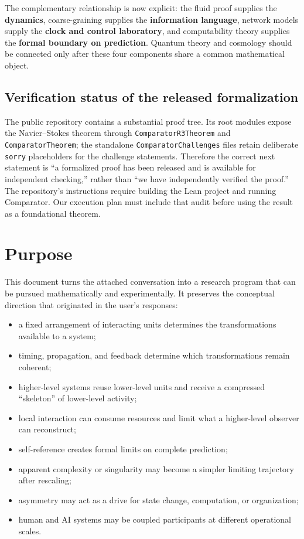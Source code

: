 \documentclass[11pt]{article}
\theoremstyle{definition}
\theoremstyle{plain}
\theoremstyle{remark}
\begin{document}
The complementary relationship is now explicit: the fluid proof supplies the \textbf{dynamics}, coarse-graining supplies the \textbf{information language}, network models supply the \textbf{clock and control laboratory}, and computability theory supplies the \textbf{formal boundary on prediction}. Quantum theory and cosmology should be connected only after these four components share a common mathematical object.

\subsection{Verification status of the released formalization}

The public repository contains a substantial proof tree. Its root modules expose the Navier--Stokes theorem through \texttt{ComparatorR3Theorem} and \texttt{ComparatorTheorem}; the standalone \texttt{ComparatorChallenges} files retain deliberate \texttt{sorry} placeholders for the challenge statements. Therefore the correct next statement is ``a formalized proof has been released and is available for independent checking,'' rather than ``we have independently verified the proof.'' The repository's instructions require building the Lean project and running Comparator. Our execution plan must include that audit before using the result as a foundational theorem.

\section{Purpose}

This document turns the attached conversation into a research program that can be pursued mathematically and experimentally. It preserves the conceptual direction that originated in the user's responses:
\begin{itemize}
  \item a fixed arrangement of interacting units determines the transformations available to a system;
  \item timing, propagation, and feedback determine which transformations remain coherent;
  \item higher-level systems reuse lower-level units and receive a compressed ``skeleton'' of lower-level activity;
  \item local interaction can consume resources and limit what a higher-level observer can reconstruct;
  \item self-reference creates formal limits on complete prediction;
  \item apparent complexity or singularity may become a simpler limiting trajectory after rescaling;
  \item asymmetry may act as a drive for state change, computation, or organization;
  \item human and AI systems may be coupled participants at different operational scales.
\end{itemize}
\end{document}
